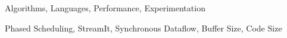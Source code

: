 
\begin{terms}
Algorithms, Languages, Performance, Experimentation
\end{terms}

\begin{keywords}
Phased Scheduling, StreamIt, Synchronous Dataflow, Buffer Size, Code Size
\end{keywords}
